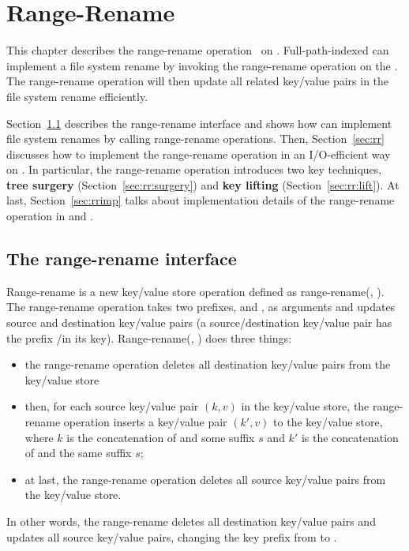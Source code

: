 \chapter{Range-Rename}
\label{chap:rename}

This chapter describes the range-rename operation~\citep{betrfs4,betrfs4tos}
on \bets.
Full-path-indexed \betrfs can implement a file system rename by invoking the
range-rename operation on the \bet.
The range-rename operation will then update all related key/value pairs in
the file system rename efficiently.

Section~\ref{sec:rrint} describes the range-rename interface and shows how
\betrfs can implement file system renames by calling range-rename operations.
Then, Section~\ref{sec:rr} discusses how to implement the range-rename operation
in an I/O-efficient way on \bets.
In particular, the range-rename operation introduces two key techniques,
\textbf{tree surgery} (Section~\ref{sec:rr:surgery}) and
\textbf{key lifting} (Section~\ref{sec:rr:lift}).
At last, Section~\ref{sec:rrimp} talks about implementation details of
the range-rename operation in \fti and \betrfs.

\section{The range-rename interface}
\label{sec:rrint}

Range-rename is a new key/value store operation defined as
range-rename(\spre, \dpre).
The range-rename operation takes two prefixes, \spre and \dpre, as arguments
and updates source and destination key/value pairs
(a source/destination key/value pair has the prefix \spre/\dpre in its key).
Range-rename(\spre, \dpre) does three things:
\begin{itemize}
\item the range-rename operation deletes all destination key/value pairs
    from the key/value store
\item then, for each source key/value pair $(k,v)$ in the key/value store,
    the range-rename operation inserts a key/value pair $(k',v)$
    to the key/value store, where $k$ is the concatenation of \spre and some
    suffix $s$ and $k'$ is the concatenation of \dpre and the same suffix $s$;
\item at last, the range-rename operation deletes all source key/value pairs
    from the key/value store.
\end{itemize}
In other words, the range-rename deletes all destination key/value pairs and
updates all source key/value pairs, changing the key prefix from \spre to \dpre.

